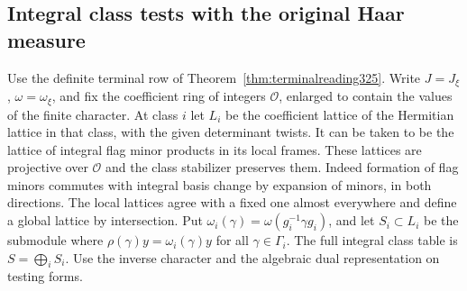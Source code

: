 \documentclass[a4paper,11pt]{article}
\theoremstyle{definition}
\theoremstyle{remark}
\numberwithin{equation}{section}
\begin{document}
\subsection{Integral class tests with the original Haar measure}\label{nav:I-81}
Use the definite terminal row of Theorem~\ref{thm:terminalreading325}.
Write \(J=J_\xi\), \(\omega=\omega_\xi\), and fix the
coefficient ring of integers \(\mathcal O\), enlarged to
contain the values of the finite character. At class \(i\)
let \(L_i\) be the coefficient lattice of the Hermitian
lattice in that class, with the given determinant twists.
It can be taken to be the lattice of integral flag minor
products in its local frames. These lattices are projective
over \(\mathcal O\) and the class stabilizer preserves them.
Indeed formation of flag minors commutes with integral
basis change by expansion of minors, in both directions.
The local lattices agree with a fixed one almost everywhere
and define a global lattice by intersection. Put
\(\omega_i(\gamma)=\omega(g_i^{-1}\gamma g_i)\), and let
\(S_i\subset L_i\) be the submodule where
\(\rho(\gamma)y=\omega_i(\gamma)y\) for all \(\gamma\in
\Gamma_i\). The full integral class table is \(S=\bigoplus_iS_i\).
Use the inverse character and the algebraic dual representation
on testing forms.
\end{document}
